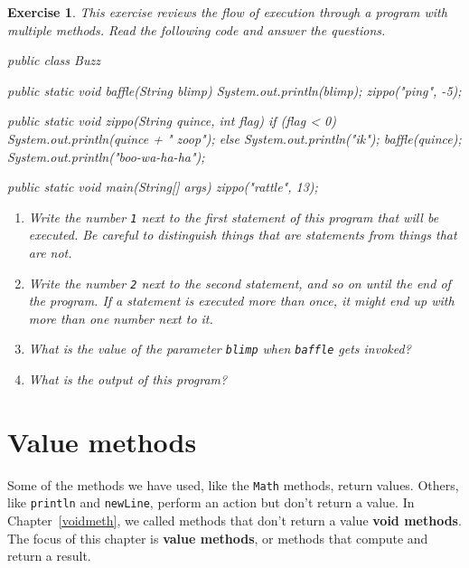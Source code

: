 \documentclass[12pt]{book}
\theoremstyle{exercise}
\newtheorem{exercise}{Exercise}[chapter]
\newcommand{\java}[1]{\verb"#1"}
\newcommand{\java}[1]{\lstinline{#1}} %
\begin{document}
\begin{exercise}

This exercise reviews the flow of execution through a program with multiple methods.
Read the following code and answer the questions.

\begin{code}
public class Buzz {

    public static void baffle(String blimp) {
        System.out.println(blimp);
        zippo("ping", -5);
    }

    public static void zippo(String quince, int flag) {
        if (flag < 0) {
            System.out.println(quince + " zoop");
        } else {
            System.out.println("ik");
            baffle(quince);
            System.out.println("boo-wa-ha-ha");
        }
    }

    public static void main(String[] args) {
        zippo("rattle", 13);
    }

}
\end{code}

\begin{enumerate}

\item Write the number {\tt 1} next to the first {\em statement} of this program that will be executed.
Be careful to distinguish things that are statements from things that are not.

\item Write the number {\tt 2} next to the second statement, and so on until the end of the program.
If a statement is executed more than once, it might end up with more than one number next to it.

\item What is the value of the parameter \java{blimp} when \java{baffle} gets invoked?

\item What is the output of this program?

\end{enumerate}

\end{exercise}


\chapter{Value methods}


Some of the methods we have used, like the \java{Math} methods, return values.
Others, like \java{println} and \java{newLine}, perform an action but don't return a value.
In Chapter~\ref{voidmeth}, we called methods that don't return a value {\bf void methods}.
The focus of this chapter is {\bf value methods}, or methods that compute and return a result.
\end{document}
